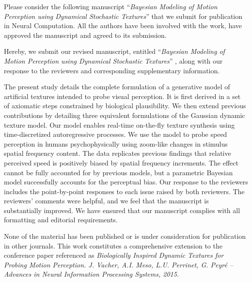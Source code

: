 \documentclass[stdletter,8pt,dateno]{newlfm}%
\newcommand{\Title}{Bayesian Modeling of Motion Perception using Dynamical Stochastic Textures}%
\newcommand{\Journal}{Neural Computation}%
\begin{document}
\begin{newlfm}

Please consider the following manuscript ``{\it \Title }'' that we submit for publication in \Journal . All the authors have been involved with the work, have approved the manuscript and agreed to its submission.

Hereby, we submit our revised manuscript, entitled ``{\it \Title }'' ,  along  with  our  response  to  the  reviewers  and  corresponding  supplementary  information.  


The present study details the complete formulation of a generative
model of artificial textures intended to probe visual perception. It is first derived in a set of
axiomatic steps constrained by biological plausibility. We then extend previous contributions
by detailing three equivalent formulations of the Gaussian dynamic texture
model. Our model enables real-time on-the-fly texture synthesis using time-discretized autoregressive
processes. We use the model to probe speed perception in humans psychophysically using zoom-like changes
in stimulus spatial frequency content. The data replicates previous findings that relative perceived speed is positively biased by spatial
frequency increments. The effect cannot be fully accounted for by previous models,
but a parametric Bayesian model successfully accounts for the perceptual bias.
%
Our  response  to  the  reviewers  includes  the  point-by-point  responses  to  each  issue  raised  by  
both reviewers. The reviewers’ comments were helpful, and we feel that the manuscript is substantially improved.  
We have ensured that our manuscript complies with all formatting and editorial requirements.  


None of the material has been published or is under consideration for
publication in other journals. This work constitutes a comprehensive extension to the conference paper referenced as \textit{Biologically Inspired Dynamic Textures for Probing Motion Perception.
J. Vacher, A.I. Meso, L.U. Perrinet, G. Peyr\'e -- Advances in Neural Information Processing Systems, 2015.}


\end{newlfm}
\end{document}
